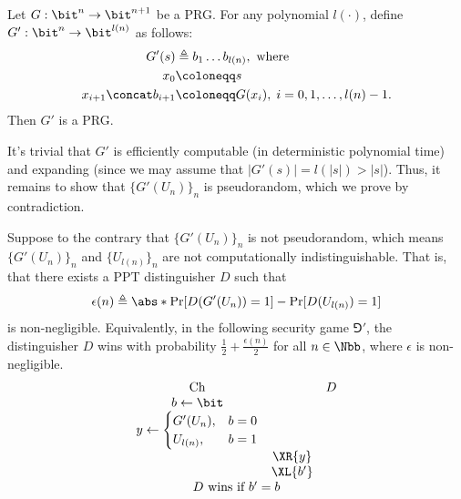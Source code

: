 \begin{problem}\label{p6}
    \leavevmode\par
    Let $G:\bit^n\to \bit^{n+1}$ be a PRG. For any polynomial $l(\cdot)$, define $G':\bit^n\to\bit^{l(n)}$ as follows: 
    \begin{align*}
        G'(s) &\triangleq b_1\ldots b_{l(n)},\textrm{ where}\\
        x_0 &\coloneqq s\\
        x_{i+1}\concat b_{i+1} &\coloneqq G(x_i),\; i=0,1,\ldots,l(n)-1.
    \end{align*}
    Then $G'$ is a PRG.
\end{problem}

\begin{answer}
    It's trivial that $G'$ is efficiently computable (in deterministic polynomial time) and expanding (since we may assume that $|G'(s)|=l(|s|)\gt |s|$). Thus, it remains to show that $\{G'(U_n)\}_n$ is pseudorandom, which we prove by contradiction.

    Suppose to the contrary that  $\{G'(U_n)\}_n$ is not pseudorandom, which means $\{G'(U_n)\}_n$ and $\{U_{l(n)}\}_n$ are not computationally indistinguishable. That is, that there exists a PPT distinguisher $D$ such that
    \begin{equation}\label{eq:p6-2}
        \epsilon(n)\triangleq \abs*{\Pr[D(G'(U_n)) = 1]  -\Pr[D(U_{l(n)}) = 1]} 
    \end{equation}
    is non-negligible. Equivalently, in the following security game $\Game'$, the distinguisher $D$ wins with probability $\frac{1}{2}+\frac{\epsilon(n)}{2}$ for all $n\in\Nbb$, where $\epsilon$ is non-negligible.
    {
        \[
            \begin{array}{@{} c c c @{}}
            \text{Ch} & & D \\
            b \leftarrow \bit & & \\
            y \leftarrow \begin{cases} 
                G'(U_n), &b = 0 \\
                U_{l(n)}, &b = 1 
            \end{cases} & & \\
            & \XR{y} & \\
            & \XL{b'} & \\
            \multicolumn{3}{c}{\text{$D$ wins if $b' = b$}}
        \end{array}
        \]
        \label{fig:p6-game1}
    }


\end{answer}

